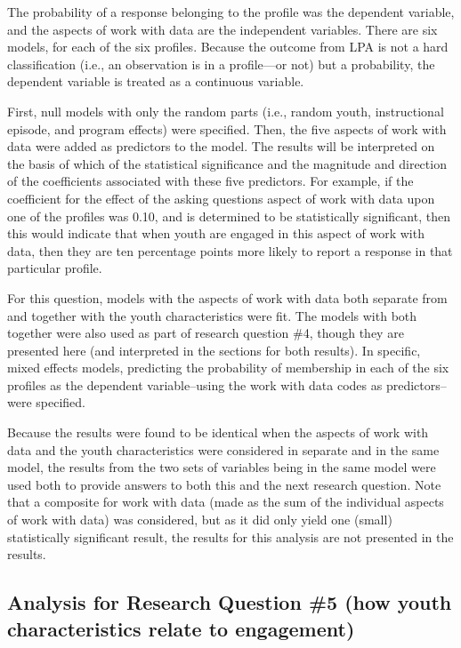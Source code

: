 \documentclass[]{book}
\theoremstyle{definition}
\theoremstyle{definition}
\theoremstyle{definition}
\theoremstyle{remark}
\begin{document}
The probability of a response belonging to the profile was the dependent
variable, and the aspects of work with data are the independent
variables. There are six models, for each of the six profiles. Because
the outcome from LPA is not a hard classification (i.e., an observation
is in a profile---or not) but a probability, the dependent variable is
treated as a continuous variable.

First, null models with only the random parts (i.e., random youth,
instructional episode, and program effects) were specified. Then, the
five aspects of work with data were added as predictors to the model.
The results will be interpreted on the basis of which of the statistical
significance and the magnitude and direction of the coefficients
associated with these five predictors. For example, if the coefficient
for the effect of the asking questions aspect of work with data upon one
of the profiles was 0.10, and is determined to be statistically
significant, then this would indicate that when youth are engaged in
this aspect of work with data, then they are ten percentage points more
likely to report a response in that particular profile.

For this question, models with the aspects of work with data both
separate from and together with the youth characteristics were fit. The
models with both together were also used as part of research question
\#4, though they are presented here (and interpreted in the sections for
both results). In specific, mixed effects models, predicting the
probability of membership in each of the six profiles as the dependent
variable--using the work with data codes as predictors--were specified.

Because the results were found to be identical when the aspects of work
with data and the youth characteristics were considered in separate and
in the same model, the results from the two sets of variables being in
the same model were used both to provide answers to both this and the
next research question. Note that a composite for work with data (made
as the sum of the individual aspects of work with data) was considered,
but as it did only yield one (small) statistically significant result,
the results for this analysis are not presented in the results.

\subsection{Analysis for Research Question \#5 (how youth
characteristics relate to
engagement)}\label{analysis-for-research-question-5-how-youth-characteristics-relate-to-engagement}
\end{document}
